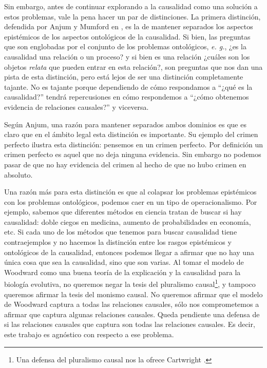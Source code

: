 {Sin embargo, antes de continuar explorando a la causalidad como una solución a estos problemas, vale la pena hacer un par  de distinciones. La primera distinción, defendida por Anjum y Mumford en \citeyear{Anjum2018}, es la de mantener separados los aspectos epistémicos de los aspectos ontológicos de la causalidad. Si bien, las preguntas que son englobadas por el conjunto de los problemas ontológicos, \textit{e. g.}, ¿es la causalidad una relación o un proceso? y si bien es una relación ¿cuáles son los objetos \textit{relata} que pueden entrar en esta relación?, son preguntas que nos dan una pista de esta distinción, pero está lejos de ser una distinción completamente tajante. No es tajante porque dependiendo de cómo respondamos a ``¿qué es la causalidad?'' tendrá repercusiones en cómo respondemos a ``¿cómo obtenemos evidencia de relaciones causales?'' y viceversa.

Según Anjum, una razón para mantener separados ambos dominios es que es claro que en el ámbito legal esta distinción es importante. Su ejemplo del crimen perfecto ilustra esta distinción: pensemos en un crimen perfecto. Por definición un crimen perfecto es aquel que no deja ninguna evidencia. Sin embargo no podemos pasar de que no hay evidencia del crimen al hecho de que no hubo crimen en absoluto.

Una razón más para esta distinción es que al colapsar los problemas epistémicos con los problemas ontológicos, podemos caer en un tipo de operacionalismo. Por ejemplo, sabemos que diferentes métodos en ciencia tratan de buscar si hay causalidad: doble ciegos en medicina, aumento de probabilidades en economía, etc. Si cada uno de los métodos que tenemos para buscar causalidad tiene contraejemplos y no hacemos la distinción entre los rasgos epistémicos y ontológicos de la causalidad, entonces podemos llegar a afirmar que no hay una única cosa que sea la causalidad, sino que son varias. Al tomar el modelo de Woodward como una buena teoría de la explicación y la causalidad para la biología evolutiva, no queremos negar la tesis del pluralismo causal\footnote{Una defensa del pluralismo causal nos la ofrece Cartwright \citeyear{Cartwright2007}.}, y tampoco queremos afirmar la tesis del monismo causal. No queremos afirmar que el modelo de Woodward captura a todas las relaciones causales, sólo nos comprometemos a afirmar que captura algunas relaciones causales. Queda pendiente una defensa de si las relaciones causales que captura son todas las relaciones causales. Es decir, este trabajo es agnóstico con respecto a ese problema.

}
